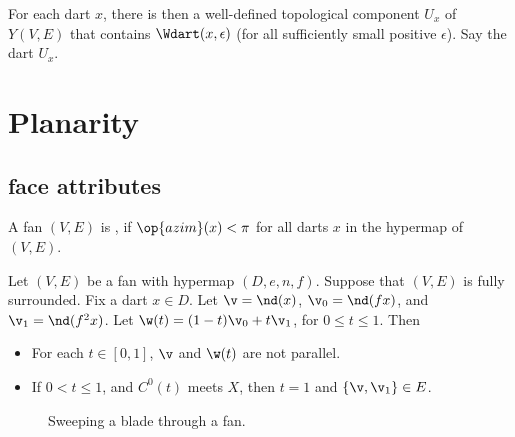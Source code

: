 \begin{definition}
For each dart $x$, 
there is then a well-defined topological
component $U_x$ of $Y(V,E)$ 
that contains $\Wdart(x,\epsilon)$ (for all
sufficiently small positive $\epsilon$). Say the dart 
$U_x$.
\end{definition}
%


\section{Planarity}


\subsection{face attributes}

\begin{definition}
A fan $(V,E)$ is , if $\op{azim}(x)<\pi$
for all darts $x$ in the hypermap of $(V,E)$.
\end{definition}
%

\begin{lemma}[sweep]\label{lemma:sweep}  
Let $(V,E)$ be a fan with hypermap $(D,e,n,f)$.  
Suppose that $(V,E)$ is fully surrounded. Fix a dart $x\in D$.
Let $\v = \nd(x)$, $\v_0 = \nd(f x)$,
and $\v_1 = \nd(f^2 x)$.  Let $\w(t) = (1-t) \v_0 + t \v_1$, for
$0\le t\le 1$.  Then
\begin{itemize}
\item  For each $t\in[0,1]$, $\v$ and $\w(t)$ are not parallel.
\item If $0 < t \le 1$, and $C^0(t)$ meets $X$, then $t=1$ and
$\{\v,\v_1\}\in E$.
\end{itemize}
\end{lemma}


\begin{figure}[htb]
\centering
{}
\caption{Sweeping a blade through a fan.}
\label{fig:vt}
\end{figure}


